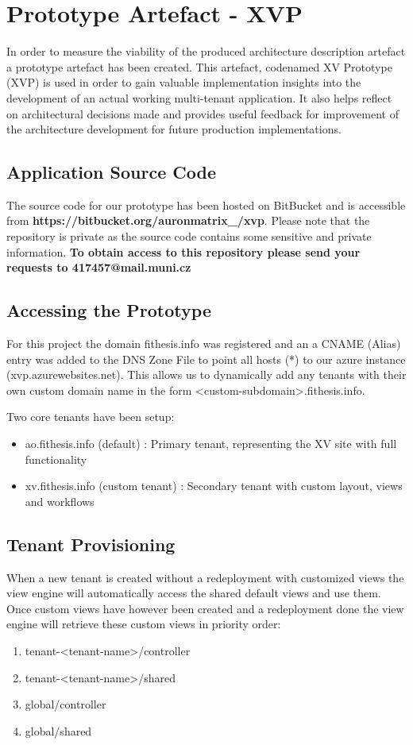 \chapter{Prototype Artefact - XVP}

In order to measure the viability of the produced architecture description artefact a prototype artefact has been created. This artefact, codenamed XV Prototype (XVP) is used in order to gain valuable implementation insights into the development of an actual working multi-tenant application. It also helps reflect on architectural decisions made and provides useful feedback for improvement of the architecture development for future production implementations.

\section{Application Source Code}

The source code for our prototype has been hosted on BitBucket and is accessible from \textbf{https://bitbucket.org/auronmatrix\_/xvp}. Please note that the repository is private as the source code contains some sensitive and private information. \textbf{To obtain access to this repository please send your requests to 417457@mail.muni.cz}

\section{Accessing the Prototype}
For this project the domain fithesis.info was registered and an a CNAME (Alias) entry was added to the DNS Zone File to point all hosts (*) to our azure instance (xvp.azurewebsites.net). This allows us to dynamically add any tenants with their own custom domain name in the form
<custom-subdomain>.fithesis.info. 

Two core tenants have been setup:
\begin{itemize}
\item ao.fithesis.info (default) : Primary tenant, representing the XV site with full functionality
\item xv.fithesis.info (custom tenant) : Secondary tenant with custom layout, views and workflows
\end{itemize}

\section{Tenant Provisioning}
When a new tenant is created without a redeployment with customized views the view engine will automatically access the shared default views and use them. Once custom views have however been created and a redeployment done the view engine will retrieve these custom views in priority order:
\begin{enumerate}
\item tenant-<tenant-name>/controller
\item tenant-<tenant-name>/shared
\item global/controller
\item global/shared
\end{enumerate}

